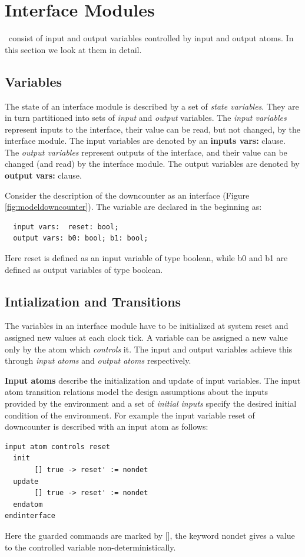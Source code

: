 \section{Interface Modules}
\im\ consist of input and output variables controlled by input and
output atoms. In this section we look at them in detail.

\subsection{Variables}
The state of an interface module is described by a set of {\em
state variables}. They are in turn partitioned into sets of {\em
input\/} and {\em output\/} variables. The \emph{input variables}
represent inputs to the interface, their value can be read, but
not changed, by the interface module. The input variables are
denoted by an \textbf{inputs vars:} clause. The \emph{output
variables} represent outputs of the interface, and their value can
be changed (and read) by the interface module. The output
variables are denoted by \textbf{output vars:} clause.

Consider the description of the downcounter as an interface
(Figure \ref{fig:modeldowncounter}). The variable are declared in
the beginning as:
\begin{verbatim}
  input vars:  reset: bool;
  output vars: b0: bool; b1: bool;
\end{verbatim}
Here reset is defined as an input variable of type boolean, while
b0 and b1 are defined as output variables of type boolean.

\subsection{Intialization and Transitions}
The variables in an interface module have to be initialized at
system reset and assigned new values at each clock tick. A
variable can be assigned a new value only by the atom which
\emph{controls} it. The input and output variables achieve this
through \emph{input atoms} and \emph{output atoms} respectively.

\textbf{Input atoms} describe the initialization and update of
input variables. The input atom transition relations model the
design assumptions about the inputs provided by the environment
and a set of {\em initial inputs\/} specify the desired initial
condition of the environment. For example the input variable reset
of downcounter is described with an input atom as follows:
\begin{verbatim}
input atom controls reset
  init
       [] true -> reset' := nondet
  update
       [] true -> reset' := nondet
  endatom
endinterface
\end{verbatim}
Here the guarded commands are marked by [], the keyword nondet
gives a value to the controlled variable non-deterministically.

